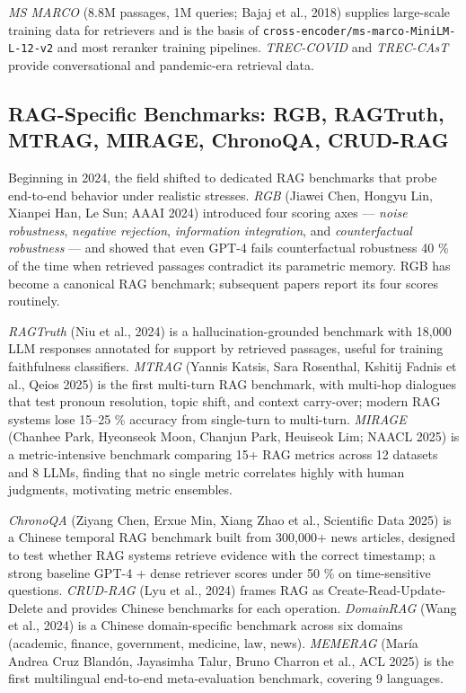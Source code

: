 \emph{MS MARCO} (8.8M passages, 1M queries; Bajaj et al., 2018) supplies large-scale training data for retrievers and is the basis of \texttt{cross-encoder/ms-marco-MiniLM-L-12-v2} and most reranker training pipelines. \emph{TREC-COVID} and \emph{TREC-CAsT} provide conversational and pandemic-era retrieval data.

\subsection{RAG-Specific Benchmarks: RGB, RAGTruth, MTRAG, MIRAGE, ChronoQA, CRUD-RAG}\label{rag-specific-benchmarks-rgb-ragtruth-mtrag-mirage-chronoqa-crud-rag}

Beginning in 2024, the field shifted to dedicated RAG benchmarks that probe end-to-end behavior under realistic stresses. \emph{RGB} (Jiawei Chen, Hongyu Lin, Xianpei Han, Le Sun; AAAI 2024) introduced four scoring axes --- \emph{noise robustness}, \emph{negative rejection}, \emph{information integration}, and \emph{counterfactual robustness} --- and showed that even GPT-4 fails counterfactual robustness 40 \% of the time when retrieved passages contradict its parametric memory. RGB has become a canonical RAG benchmark; subsequent papers report its four scores routinely.

\emph{RAGTruth} (Niu et al., 2024) is a hallucination-grounded benchmark with 18,000 LLM responses annotated for support by retrieved passages, useful for training faithfulness classifiers. \emph{MTRAG} (Yannis Katsis, Sara Rosenthal, Kshitij Fadnis et al., Qeios 2025) is the first multi-turn RAG benchmark, with multi-hop dialogues that test pronoun resolution, topic shift, and context carry-over; modern RAG systems lose 15--25 \% accuracy from single-turn to multi-turn. \emph{MIRAGE} (Chanhee Park, Hyeonseok Moon, Chanjun Park, Heuiseok Lim; NAACL 2025) is a metric-intensive benchmark comparing 15+ RAG metrics across 12 datasets and 8 LLMs, finding that no single metric correlates highly with human judgments, motivating metric ensembles.

\emph{ChronoQA} (Ziyang Chen, Erxue Min, Xiang Zhao et al., Scientific Data 2025) is a Chinese temporal RAG benchmark built from 300,000+ news articles, designed to test whether RAG systems retrieve evidence with the correct timestamp; a strong baseline GPT-4 + dense retriever scores under 50 \% on time-sensitive questions. \emph{CRUD-RAG} (Lyu et al., 2024) frames RAG as Create-Read-Update-Delete and provides Chinese benchmarks for each operation. \emph{DomainRAG} (Wang et al., 2024) is a Chinese domain-specific benchmark across six domains (academic, finance, government, medicine, law, news). \emph{MEMERAG} (María Andrea Cruz Blandón, Jayasimha Talur, Bruno Charron et al., ACL 2025) is the first multilingual end-to-end meta-evaluation benchmark, covering 9 languages.

